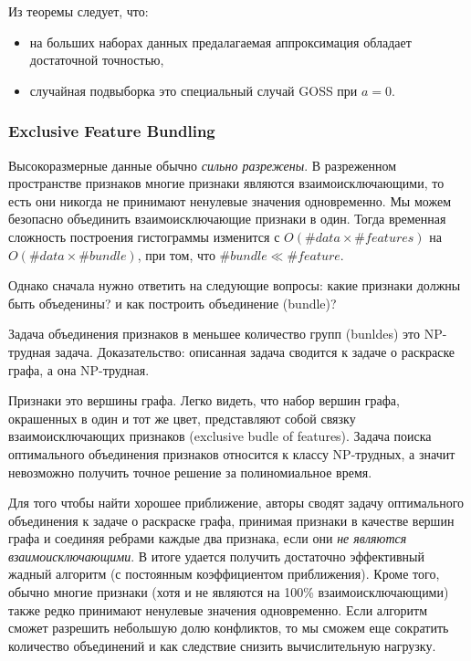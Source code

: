 \documentclass[%
	11pt,
	a4paper,
	utf8,
		]{article}
\begin{document}
Из теоремы следует, что:
\begin{itemize}
	\item на больших наборах данных предалагаемая аппроксимация обладает достаточной точностью,
	
	\item случайная подвыборка это специальный случай GOSS при $ a = 0 $.
\end{itemize}

\subsubsection{Exclusive Feature Bundling}

Высокоразмерные данные обычно \emph{сильно разрежены}. В разреженном пространстве признаков многие признаки являются взаимоисключающими, то есть они никогда не принимают ненулевые значения одновременно. Мы можем безопасно объединить взаимоисключающие признаки в один. Тогда временная сложность построения гистограммы изменится с $ O(\#data \times \#features) $ на $ O(\#data \times \#bundle) $, при том, что $ \#bundle \ll \#feature $.

Однако сначала нужно ответить на следующие вопросы: какие признаки должны быть объеденины? и как построить объединение (bundle)?

Задача объединения признаков в меньшее количество групп (bunldes) это NP-трудная задача. Доказательство: описанная задача сводится к задаче о раскраске графа, а она NP-трудная.

Признаки это вершины графа. Легко видеть, что набор вершин графа, окрашенных в один и тот же цвет, представляют собой связку взаимоисключающих признаков (exclusive budle of features). Задача поиска оптимального объединения признаков относится к классу NP-трудных, а значит невозможно получить точное решение за полиномиальное время.

Для того чтобы найти хорошее приближение, авторы сводят задачу оптимального объединения к задаче о раскраске графа, принимая признаки в качестве вершин графа и соединяя ребрами каждые два признака, если они \emph{не являются взаимоисключающими}. В итоге удается получить достаточно эффективный жадный алгоритм (с постоянным коэффициентом приближения). Кроме того, обычно многие признаки (хотя и не являются на 100\% взаимоисключающими) также редко принимают ненулевые значения одновременно. Если алгоритм сможет разрешить небольшую долю конфликтов, то мы сможем еще сократить количество объединений и как следствие снизить вычислительную нагрузку.
\end{document}
